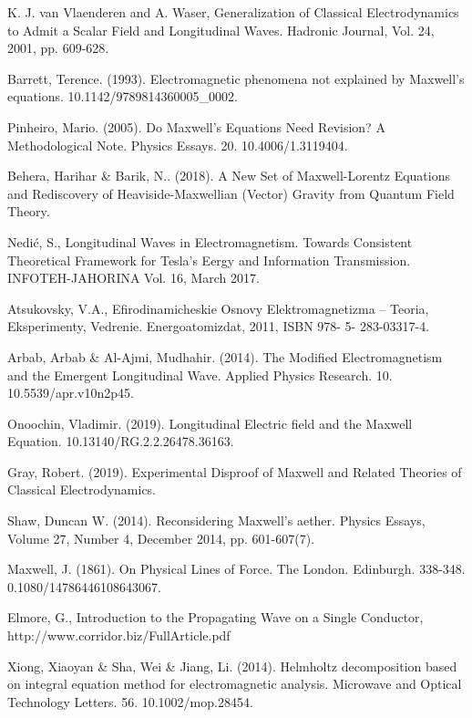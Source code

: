 \documentclass[twoside,final]{article}
\begin{document}
{\begin{thebibliography}{99}
 K. J. van Vlaenderen and A. Waser, Generalization of
Classical Electrodynamics to Admit a Scalar Field and Longitudinal Waves.
Hadronic Journal, Vol. 24, 2001, pp. 609-628. 

 Barrett, Terence. (1993). Electromagnetic phenomena not
explained by Maxwell's equations. 10.1142/9789814360005\_0002. 

 Pinheiro, Mario. (2005). Do Maxwell's Equations Need
Revision? A Methodological Note. Physics Essays. 20. 10.4006/1.3119404. 

 Behera, Harihar \& Barik, N.. (2018). A New Set of
Maxwell-Lorentz Equations and Rediscovery of Heaviside-Maxwellian (Vector)
Gravity from Quantum Field Theory. 

 Nedi\'{c}, S., Longitudinal Waves in Electromagnetism.
Towards Consistent Theoretical Framework for Tesla's Eergy and Information
Transmission. INFOTEH-JAHORINA Vol. 16, March 2017. 


 Atsukovsky, V.A., Efirodinamicheskie Osnovy
Elektromagnetizma -- Teoria, Eksperimenty, Vedrenie. Energoatomizdat, 2011, ISBN
978- 5- 283-03317-4. 

 Arbab, Arbab \& Al-Ajmi, Mudhahir. (2014). The Modified
Electromagnetism and the Emergent Longitudinal Wave. Applied Physics Research.
10. 10.5539/apr.v10n2p45. 

 Onoochin, Vladimir. (2019). Longitudinal Electric field
and the Maxwell Equation. 10.13140/RG.2.2.26478.36163. 

 Gray, Robert. (2019). Experimental Disproof of Maxwell and
Related Theories of Classical Electrodynamics. 

 Shaw, Duncan W. (2014). Reconsidering Maxwell's aether.
Physics Essays, Volume 27, Number 4, December 2014, pp. 601-607(7). 



 Maxwell, J. (1861). On Physical Lines of Force. The
London. Edinburgh. 338-348. 0.1080/14786446108643067.

 Elmore, G., Introduction to the Propagating Wave on a
Single Conductor, http://www.corridor.biz/FullArticle.pdf


 Xiong, Xiaoyan \& Sha, Wei \& Jiang, Li. (2014). Helmholtz
decomposition based on integral equation method for electromagnetic analysis.
Microwave and Optical Technology Letters. 56. 10.1002/mop.28454. 


\end{thebibliography}}
\end{document}
